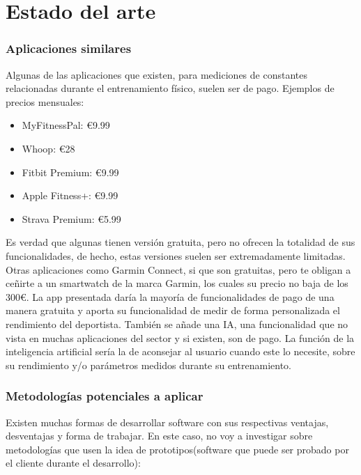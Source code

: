 \chapter{Estado del arte}
\subsection{Aplicaciones similares}

Algunas de las aplicaciones que existen, para mediciones de constantes relacionadas durante el entrenamiento físico, suelen ser de pago. Ejemplos de precios mensuales:

\begin{itemize}
	\item MyFitnessPal: €9.99
	\item Whoop: €28
	\item Fitbit Premium: €9.99
	\item Apple Fitness+: €9.99
	\item Strava Premium: €5.99
\end{itemize}

Es verdad que algunas tienen versión gratuita, pero no ofrecen la totalidad de sus funcionalidades, de hecho, estas versiones suelen ser extremadamente limitadas. Otras aplicaciones como Garmin Connect, si que son gratuitas, pero te obligan a ceñirte a un smartwatch de la marca Garmin, los cuales su precio no baja de los 300€. 
La app presentada daría la mayoría de funcionalidades de pago de una manera gratuita y aporta su funcionalidad de medir de forma personalizada el rendimiento del deportista. También se añade una IA, una funcionalidad que no vista en muchas aplicaciones del sector y si existen, son de pago. La función de la inteligencia artificial sería la de aconsejar al usuario cuando este lo necesite, sobre su rendimiento y/o parámetros medidos durante su entrenamiento.

\subsection{Metodologías potenciales a aplicar}

Existen muchas formas de desarrollar software con sus respectivas ventajas, desventajas y forma de trabajar. En este caso, no voy a investigar sobre metodologías que usen la idea de prototipos(software que puede ser probado por el cliente durante el desarrollo):

